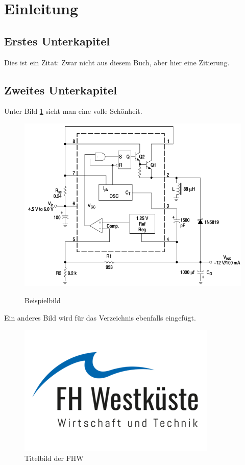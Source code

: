\section{Einleitung}
\subsection{Erstes Unterkapitel}
Dies ist ein Zitat:
\lipsum[1-2]
Zwar nicht aus diesem Buch, aber hier eine Zitierung. \citep[vgl. ][S. 5-6]{bernstein97}
\subsection{Zweites Unterkapitel}
Unter Bild \ref{pic:bildname} sieht man eine volle Schönheit.
\begin{figure}[ht]
	\centering
	\includegraphics[scale=0.5]{pic/bildname}
	\caption{Beispielbild}
	\label{pic:bildname}
	\quelle \citep[S. 8]{onsemi:MC34063A}
\end{figure}
Ein anderes Bild wird für das Verzeichnis ebenfalls eingefügt.
\begin{figure}[ht]
	\centering
	\includegraphics[scale=0.5]{pic/title/fhw_logo}
	\caption{Titelbild der FHW}
	\label{pic:titelbild}
\end{figure}

